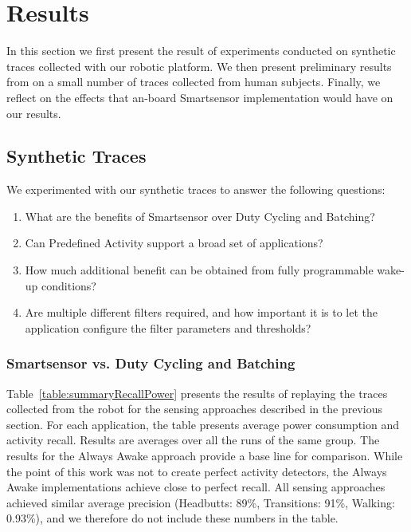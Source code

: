 \section{Results}
\label{sec:results}

In this section we first present the result of experiments conducted
on synthetic traces collected with our robotic platform.  We then
present preliminary results from on a small number of traces collected
from human subjects.  Finally, we reflect on the effects that an-board
Smartsensor implementation would have on our results.

\subsection{Synthetic Traces}

We experimented with our synthetic traces to answer the following questions:

\begin{enumerate}
\setlength{\itemsep}{-3pt}  

\item What are the benefits of Smartsensor over Duty Cycling and
  Batching?

\item Can Predefined Activity support a broad set of applications?

\item How much additional benefit can be obtained from fully
  programmable wake-up conditions?

\item Are multiple different filters required, and how important it is
  to let the application configure the filter parameters and
  thresholds?

\end{enumerate}

\subsubsection{Smartsensor vs. Duty Cycling and Batching}

Table~\ref{table:summaryRecallPower} presents the results of replaying
the traces collected from the robot for the sensing approaches
described in the previous section.  For each application, the table
presents average power consumption and activity recall.  Results are
averages over all the runs of the same group.  The results for the
Always Awake approach provide a base line for comparison.  While the
point of this work was not to create perfect activity detectors, the
Always Awake implementations achieve close to perfect recall.  All
sensing approaches achieved similar average precision (Headbutts:
89\%, Transitions: 91\%, Walking: 0.93\%), and we therefore do not
include these numbers in the table.

